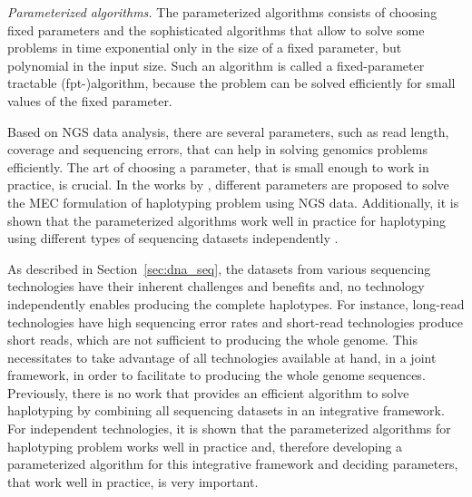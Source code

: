 \textit{Parameterized algorithms.} 
The parameterized algorithms consists of choosing fixed parameters and the sophisticated algorithms that allow to solve some problems in time exponential only in the size of a fixed parameter, but polynomial in the input size. 
Such an algorithm is called a fixed-parameter tractable (fpt-)algorithm, because the problem can be solved efficiently for small values of the fixed parameter.

Based on NGS data analysis, there are several parameters, such as read length, coverage and sequencing errors, that can help in solving genomics problems efficiently. 
The art of choosing a parameter, that is small enough to work in practice, is crucial.
In the works by \cite{he2010optimal,Patterson2015,Pirola2015}, different parameters are proposed to solve the MEC formulation of haplotyping problem using NGS data. 
Additionally, it is shown that the parameterized algorithms work well in practice for haplotyping using different types of sequencing datasets independently \citep{martin2016whatshap}. 

As described in Section~\ref{sec:dna_seq}, the datasets from various sequencing technologies have their inherent challenges and benefits and, no technology independently enables producing the complete haplotypes.
For instance, long-read technologies have high sequencing error rates and short-read technologies produce short reads, which are not sufficient to producing the whole genome.
This necessitates to take advantage of all technologies available at hand, in a joint framework, in order to facilitate to producing the whole genome sequences.
Previously, there is no work that provides an efficient algorithm to solve haplotyping by combining all sequencing datasets in an integrative framework.
For independent technologies, it is shown that the parameterized algorithms for haplotyping problem works well in practice \citep{klau2017guided} and, 
therefore developing a parameterized algorithm for this integrative framework and deciding parameters, that work well in practice, is very important. 

